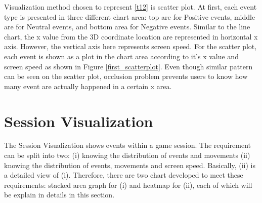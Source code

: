 Visualization method chosen to represent \ref{t12} is scatter plot. At first, each event type is presented in three different chart area: top are for Positive events, middle are for Neutral events, and bottom area for Negative events. Similar to the line chart, the x value from the 3D coordinate location are represented in horizontal x axis. However, the vertical axis here represents screen speed. For the scatter plot, each event is shown as a plot in the chart area according to it's x value and screen speed as shown in Figure \ref{first_scatterplot}. Even though similar pattern can be seen on the scatter plot, occlusion problem prevents users to know how many event are actually happened in a certain x area.

\section{Session Visualization}
The Session Visualization shows events within a game session. The requirement can be split into two: (i) knowing the distribution of events and movements (ii) knowing the distribution of events, movements and screen speed. Basically, (ii) is a detailed view of (i). Therefore, there are two chart developed to meet these requirements: stacked area graph for (i) and heatmap for (ii), each of which will be explain in details in this section.

